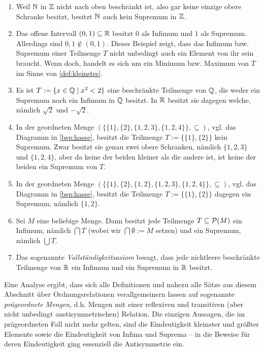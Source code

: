 \begin{bsp}
    \begin{enumerate}
        \item Weil $\mathbb N$ in $\mathbb Z$ nicht nach oben beschränkt ist, also gar keine einzige obere Schranke besitzt, besitzt $\mathbb N$ auch kein Supremum in $\mathbb Z$.
        \item Das offene Intervall $(0,1)\subseteq \mathbb R$ besitzt $0$ als Infimum und $1$ als Supremum. Allerdings sind $0,1\notin (0,1)$. Dieses Beispiel zeigt, dass das Infimum bzw. Supremum einer Teilmenge $T$ nicht unbedingt auch ein Element von ihr sein braucht. Wenn doch, handelt es sich um ein Minimum bzw. Maximum von $T$ im Sinne von \cref{def:kleinstes}.
        \item Es ist $T:=\{x\in \mathbb Q \mid x^2 < 2\}$ eine beschränkte Teilmenge von $\mathbb Q$, die weder ein Supremum noch ein Infimum in $\mathbb Q$ besitzt. In $\mathbb R$ besitzt sie dagegen welche, nämlich $\sqrt{2}$ und $-\sqrt{2}$.
        \item In der geordneten Menge $(\{\{1\},\{2\},\{1,2,3\},\{1,2,4\}\},\subseteq)$, vgl. das Diagramm in \cref{bsp:hasse}, besitzt die Teilmenge $T:=\{\{1\},\{2\}\}$ kein Supremum. Zwar besitzt sie genau zwei obere Schranken, nämlich $\{1,2,3\}$ und $\{1,2,4\}$, aber da keine der beiden kleiner als die andere ist, ist keine der beiden ein Supremum von $T$.
        \item In der geordneten Menge $(\{\{1\},\{2\},\{1,2\},\{1,2,3\},\{1,2,4\}\},\subseteq)$, vgl. das Diagramm in \cref{bsp:hasse}, besitzt die Teilmenge $T:=\{\{1\},\{2\}\}$ dagegen ein Supremum, nämlich $\{1,2\}$.
        \item Sei $M$ eine beliebige Menge. Dann besitzt jede Teilmenge $T\subseteq \mathcal P(M)$ ein Infimum, nämlich $\bigcap T$ (wobei wir $\bigcap \emptyset:=M$ setzen) und ein Supremum, nämlich $\bigcup T$.
        \item Das sogenannte \emph{Vollständigkeitsaxiom} besagt, dass jede nichtleere beschränkte Teilmenge von $\mathbb R$ ein Infimum und ein Supremum in $\mathbb R$ besitzt.
    \end{enumerate}
\end{bsp}


\begin{bem}
    Eine Analyse ergibt, dass sich alle Definitionen und nahezu alle Sätze aus diesem Abschnitt über Ordnungsrelationen verallgemeinern lassen auf sogenannte \emph{prägeordnete Mengen}, d.h. Mengen mit einer reflexiven und transitiven (aber nicht unbedingt anstisymmetrischen) Relation. Die einzigen Aussagen, die im prägeordneten Fall nicht mehr gelten, sind die Eindeutigkeit kleinster und größter Elemente sowie die Eindeutigkeit von Infima und Suprema -- in die Beweise für deren Eindeutigkeit ging essenziell die Antisymmetrie ein.
\end{bem}


